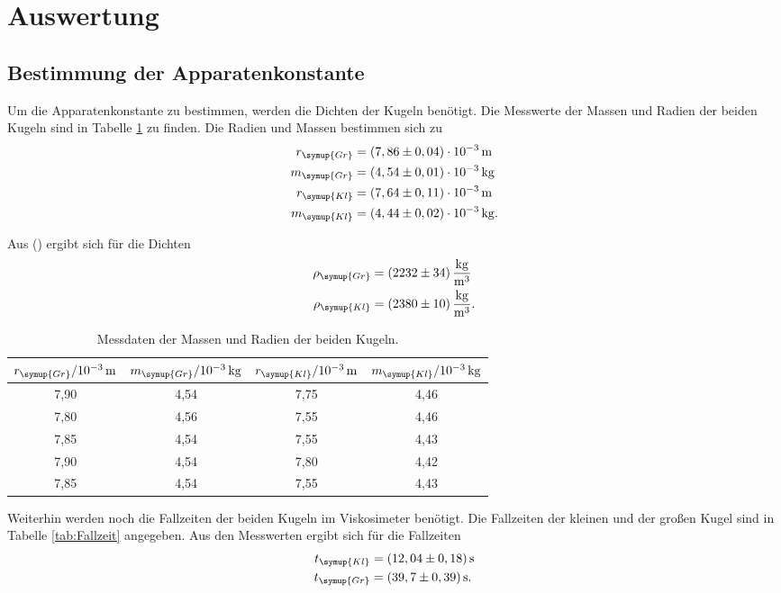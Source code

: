 \section{Auswertung}
\label{sec:Auswertung}

\subsection{Bestimmung der Apparatenkonstante}
\label{sec:Apparatenkonstante}
Um die Apparatenkonstante zu bestimmen, werden die Dichten der Kugeln benötigt.
Die Messwerte der Massen und Radien der beiden Kugeln sind in Tabelle \ref{tab:MasseundDichte} zu finden.
Die Radien und Massen bestimmen sich zu
\begin{align*}
  r_{\symup{Gr}} &= (7,86 \pm 0,04)\cdot 10^{-3} \,\si{\meter}\\
  m_{\symup{Gr}} &= (4,54 \pm 0,01) \cdot 10^{-3} \,\si{\kilo\gram}\\
  r_{\symup{Kl}} &= (7,64 \pm 0,11)\cdot 10^{-3} \,\si{\meter}\\
  m_{\symup{Kl}} &= (4,44 \pm 0,02) \cdot 10^{-3} \,\si{\kilo\gram}.\\
\end{align*}

Aus () ergibt sich für die Dichten
\begin{align*}
  \rho_{\symup{Gr}} &= (2232 \pm 34) \,\frac{\si{\kg}}{\si{m^3}}  \\
  \rho_{\symup{Kl}} &= (2380 \pm 10) \,\frac{\si{\kg}}{\si{m^3}}. \\
\end{align*}

\begin{table}
  \centering
  \caption{Messdaten der Massen und Radien der beiden Kugeln.}
  \label{tab:MasseundDichte}
  \begin{tabular}{c c c c}
    \toprule
    $r_{\symup{Gr}}/10^{-3}\,\unit{\meter}$ & $m_{\symup{Gr}}/10^{-3}\,\unit{\kilo\gram}$ & $r_{\symup{Kl}}/10^{-3}\,\unit{\meter}$ & $m_{\symup{Kl}}/10^{-3}\,\unit{\kilo\gram}$ \\
    \midrule
    7,90 & 4,54 & 7,75 & 4,46 \\
    7,80 & 4,56 & 7,55 & 4,46 \\
    7,85 & 4,54 & 7,55 & 4,43 \\
    7,90 & 4,54 & 7,80 & 4,42 \\
    7,85 & 4,54 & 7,55 & 4,43 \\
    \bottomrule
  \end{tabular}
\end{table}
Weiterhin werden noch die Fallzeiten der beiden Kugeln im Viskosimeter benötigt.
Die Fallzeiten der kleinen und der großen Kugel sind in Tabelle \ref{tab:Fallzeit} angegeben. Aus den Messwerten ergibt sich für die Fallzeiten
\begin{align*}
  t_{\symup{Kl}} &= (12,04 \pm 0,18)\,\unit{\second} \\
  t_{\symup{Gr}} &= (39,7 \pm 0,39)\,\unit{\second}. \\
\end{align*}

